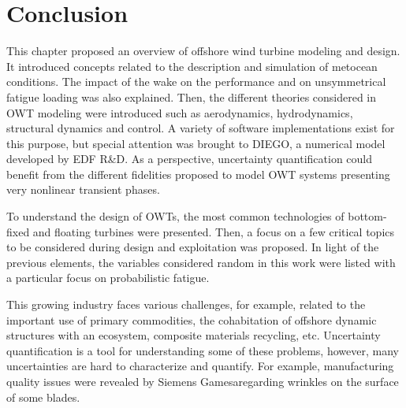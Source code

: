 \section{Conclusion}

This chapter proposed an overview of offshore wind turbine modeling and design. 
It introduced concepts related to the description and simulation of metocean conditions. 
The impact of the wake on the performance and on unsymmetrical fatigue loading was also explained.  
Then, the different theories considered in OWT modeling were introduced such as aerodynamics, hydrodynamics, structural dynamics and control. 
A variety of software implementations exist for this purpose, but special attention was brought to DIEGO, a numerical model developed by EDF R\&D. 
As a perspective, uncertainty quantification could benefit from the different fidelities proposed to model OWT systems presenting very nonlinear transient phases. 

To understand the design of OWTs, the most common technologies of bottom-fixed and floating turbines were presented. 
Then, a focus on a few critical topics to be considered during design and exploitation was proposed. 
In light of the previous elements, the variables considered random in this work were listed with a particular focus on probabilistic fatigue.   

This growing industry faces various challenges, for example, related to the important use of primary commodities, the cohabitation of offshore dynamic structures with an ecosystem, composite materials recycling, etc. 
Uncertainty quantification is a tool for understanding some of these problems, however, many uncertainties are hard to characterize and quantify. 
For example, manufacturing quality issues were revealed by Siemens Gamesa\footnotemark regarding wrinkles on the surface of some blades. 



